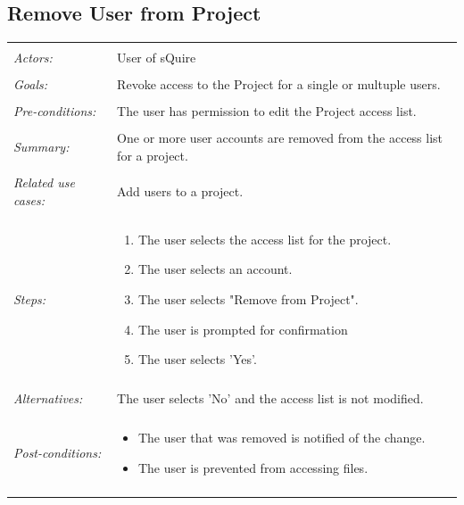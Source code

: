 \documentclass[11pt]{report}
\begin{document}
\subsection{Remove User from Project}
\begin{tabular}{ p{2cm} p{12cm} }   
 \hline
 \\
 \textit{Actors:} & User of sQuire \\
 \\
 \textit{Goals:} & Revoke access to the Project for a single or multuple users. \\
 \\
 \textit{Pre-conditions:} & The user has permission to edit the Project access list. \\
 \\
 \textit{Summary:} & One or more user accounts are removed from the access list for a project. \\ 
 \\
 \textit{Related use cases:} & Add users to a project.  \\ 
 \\
 \textit{Steps:} & \begin{enumerate}
  \item The user selects the access list for the project.
	 \item The user selects an account. 
	 \item The user selects "Remove from Project".
	 \item The user is prompted for confirmation
	 \item The user selects 'Yes'.
 \end{enumerate} \\
 \\
 \textit{Alternatives:} & The user selects 'No' and the access list is not modified. \\
 \\
 \textit{Post-conditions:} &
    \begin{itemize}
	 \item The user that was removed is notified of the change.
	 \item The user is prevented from accessing files.
    \end{itemize}\\
 \\
\hline
\end{tabular}
\end{document}
